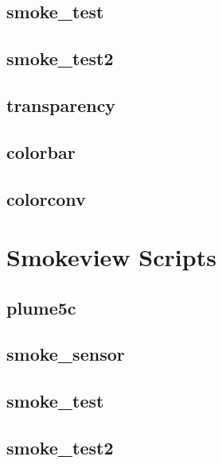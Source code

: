 \documentclass[11pt,twoside]{book}
\newcommand{\fdsinput}[1]{
{
\scriptsize

}
}
\begin{document}
\section{smoke\_test}
\label{FDSsmoketest}
\fdsinput{smoke_test.fds}

\section{smoke\_test2}
\label{FDSsmoketest2}
\fdsinput{smoke_test2.fds}

\section{transparency}
\label{FDStransparency}
\fdsinput{transparency.fds}

\section{colorbar}
\label{FDScolorbar}
\fdsinput{colorbar.fds}

\section{colorconv}
\label{FDScolorconv}
\fdsinput{colorconv.fds}

\chapter{Smokeview Scripts}
\label{smvscripts}

\section{plume5c}
\label{SSFplume5c}
\fdsinput{plume5c.ssf}

\section{smoke\_sensor}
\label{SSFsmokesensor}
\fdsinput{smoke_sensor.ssf}

\section{smoke\_test}
\label{SSFsmoketest}
\fdsinput{smoke_test.ssf}

\section{smoke\_test2}
\label{SSFsmoketest2}
\fdsinput{smoke_test2.ssf}
\end{document}

